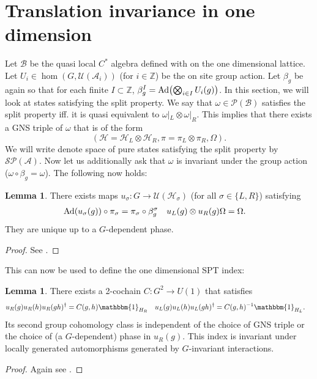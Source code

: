 \documentclass[12pt,a4paper,twoside]{article}
\let\originalleft\left
\let\originalright\right
\renewcommand{\left}{\mathopen{}\mathclose\bgroup\originalleft}
\renewcommand{\right}{\aftergroup\egroup\originalright}
\newcommand{\UU}{\mathcal U}
\newcommand{\BB}{\mathcal B}
\newcommand{\PP}{\mathcal P}
\newcommand{\HH}{\mathcal H}
\newcommand{\ZZ}{\mathbb Z}
\renewcommand{\AA}{\mathcal A}
\newcommand{\id}{\mathbbm{1}}
\newcommand{\Ad}[1]{\textrm{Ad}\left(#1\right)}
\theoremstyle{definition}
\newtheorem{lemma}[theorem]{Lemma}
\numberwithin{equation}{section}
\begin{document}
\section{Translation invariance in one dimension}\label{sec:OneDimensionalIndices}
Let $\BB$ be the quasi local $C^*$ algebra defined with on the one dimensional lattice. Let $U_i\in\hom(G,\UU(\AA_i))$ (for $i\in\ZZ$) be the on site group action. Let $\beta_g$ be again so that for each finite $I\subset \ZZ$, $\beta_g^I=\Ad{\bigotimes_{i\in I}U_i(g)}$. In this section, we will look at states satisfying the split property. We say that $\omega\in\PP(\BB)$ satisfies the split property iff. it is quasi equivalent to $\omega|_{L}\otimes\omega|_{R}$. This implies that there exists a GNS triple of $\omega$ that is of the form
\begin{equation}
	(\HH=\HH_L\otimes\HH_R,\pi=\pi_L\otimes\pi_R,\Omega).
\end{equation}
We will write denote space of pure states satisfying the split property by $\mathcal{S}\PP(\AA)$. Now let us additionally ask that $\omega$ is invariant under the group action ($\omega\circ\beta_g=\omega$). The following now holds:
\begin{lemma}
	There exists maps $u_\sigma:G\rightarrow \UU(\HH_\sigma)$ (for all $\sigma\in\{L,R\}$) satisfying
	\begin{align}
		\Ad{u_\sigma(g)}\circ\pi_\sigma&=\pi_\sigma\circ\beta_g^\sigma&u_L(g)\otimes u_R(g)\Omega&=\Omega.
	\end{align}
	They are unique up to a $G$-dependent phase.
\end{lemma}
\begin{proof}
	See \cite{ogata2019classification}.
\end{proof}
This can now be used to define the one dimensional SPT index:
\begin{lemma}
	There exists a 2-cochain $C:G^2\rightarrow U(1)$ that satisfies
	\begin{align}
		u_R(g)u_R(h)u_R(gh)^{\dagger}&=C(g,h)\id_{H_R}&u_L(g)u_L(h)u_L(gh)^{\dagger}&=C(g,h)^{-1}\id_{H_L}.
	\end{align}
	Its second group cohomology class is independent of the choice of GNS triple or the choice of (a $G$-dependent) phase in $u_R(g)$. This index is invariant under locally generated automorphisms generated by $G$-invariant interactions.
\end{lemma}
\begin{proof}
	Again see \cite{ogata2019classification}.
\end{proof}
\end{document}
